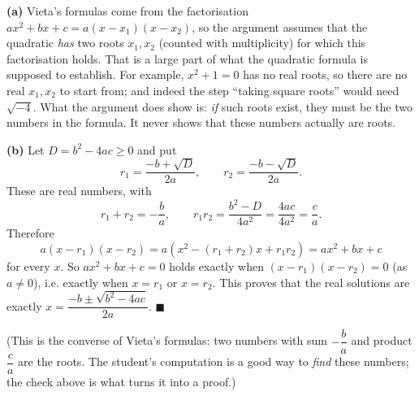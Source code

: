 \textbf{(a)} Vieta's formulas come from the factorisation $ax^2+bx+c=a(x-x_1)(x-x_2)$, so the argument assumes that the quadratic \emph{has} two roots $x_1,x_2$ (counted with multiplicity) for which this factorisation holds. That is a large part of what the quadratic formula is supposed to establish. For example, $x^2+1=0$ has no real roots, so there are no real $x_1,x_2$ to start from; and indeed the step ``taking square roots'' would need $\sqrt{-4}$. What the argument does show is: \emph{if} such roots exist, they must be the two numbers in the formula. It never shows that these numbers actually are roots.

\textbf{(b)} Let $D=b^2-4ac\ge0$ and put
\[r_1=\dfrac{-b+\sqrt D}{2a},\qquad r_2=\dfrac{-b-\sqrt D}{2a}.\]
These are real numbers, with
\[r_1+r_2=-\dfrac ba,\qquad r_1r_2=\dfrac{b^2-D}{4a^2}=\dfrac{4ac}{4a^2}=\dfrac ca.\]
Therefore
\[a(x-r_1)(x-r_2)=a\left(x^2-(r_1+r_2)x+r_1r_2\right)=ax^2+bx+c\]
for every $x$. So $ax^2+bx+c=0$ holds exactly when $(x-r_1)(x-r_2)=0$ (as $a\ne0$), i.e. exactly when $x=r_1$ or $x=r_2$. This proves that the real solutions are exactly $\boxed{x=\dfrac{-b\pm\sqrt{b^2-4ac}}{2a}}$. $\blacksquare$

(This is the converse of Vieta's formulas: two numbers with sum $-\dfrac ba$ and product $\dfrac ca$ are the roots. The student's computation is a good way to \emph{find} these numbers; the check above is what turns it into a proof.)
